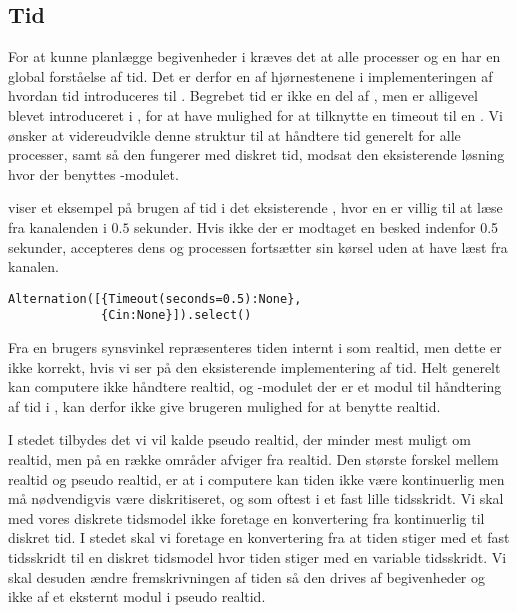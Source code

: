 \subsection{Tid} \label{sec:tid}
For at kunne planlægge begivenheder i \des kræves det at alle processer og \sched en har en global forståelse af tid.  Det er derfor en af hjørnestenene i implementeringen af \des hvordan tid introduceres til \pycsp.  
Begrebet tid er ikke en del af \csp, men er alligevel blevet introduceret i \pycsp, for  at  have
mulighed for at tilknytte en timeout til en . Vi ønsker
at videreudvikle denne struktur til at håndtere tid generelt for alle
processer, samt så den fungerer med diskret tid, modsat den eksisterende
løsning hvor der benyttes -modulet.
 
 viser et eksempel på brugen af tid i det eksisterende \pycsp, hvor en  er villig
til at læse fra kanalenden  i $0.5$ sekunder. Hvis ikke der
er modtaget en besked indenfor 0.5 sekunder, accepteres dens 
og processen fortsætter sin kørsel uden at have læst fra kanalen.

\begin{lstlisting}[float=hbtp, 
label=Timeout,caption=Timeout i Alternation (fra dokumentationen til PyCSP)]
Alternation([{Timeout(seconds=0.5):None}, 
             {Cin:None}]).select()
\end{lstlisting}


Fra en brugers synsvinkel repræsenteres tiden internt i \pycsp som realtid, men dette er ikke korrekt, hvis vi ser på den eksisterende implementering af tid. Helt generelt kan computere ikke håndtere  realtid, og -modulet der er et modul til håndtering af tid i \pycsp, kan derfor ikke give brugeren mulighed for at benytte realtid. 

 I stedet tilbydes det vi vil kalde pseudo realtid, der minder mest muligt om realtid, men på en række områder afviger fra realtid. Den største forskel mellem realtid og pseudo realtid, er at i computere kan tiden ikke være kontinuerlig men må nødvendigvis være  diskritiseret, og som oftest i et fast lille tidsskridt. Vi skal med vores diskrete tidsmodel ikke foretage en konvertering fra kontinuerlig  til diskret tid. I stedet skal vi foretage en konvertering fra at tiden stiger med et fast tidsskridt til en diskret tidsmodel hvor tiden stiger med en variable tidsskridt. Vi skal desuden ændre fremskrivningen af tiden så den  drives af begivenheder og ikke af et eksternt modul i pseudo realtid. 
 
